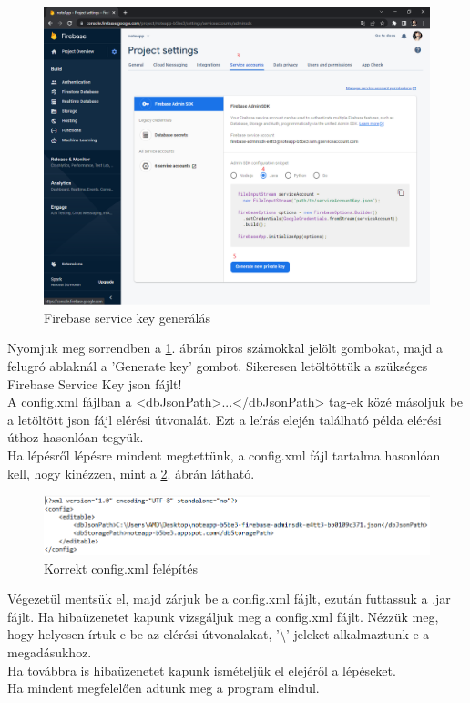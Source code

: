 \begin{figure}[H]
	\centering
	\includegraphics[scale=0.2]{images/config_5.png}
	\caption{Firebase service key generálás}
	\label{fig:firebase_service_key}
\end{figure}
\noindent Nyomjuk meg sorrendben a \ref{fig:firebase_service_key}. ábrán piros számokkal jelölt gombokat, majd a felugró ablaknál a 'Generate key' gombot. Sikeresen letöltöttük a szükséges Firebase Service Key json fájlt!
\vspace{5pt}\\A config.xml fájlban a <dbJsonPath>...</dbJsonPath> tag-ek közé másoljuk be a letöltött json fájl elérési útvonalát. Ezt a leírás elején található példa elérési úthoz hasonlóan tegyük.
\vspace{5pt}\\ Ha lépésről lépésre mindent megtettünk, a config.xml fájl tartalma hasonlóan kell, hogy kinézzen, mint a \ref{fig:config_file_final}. ábrán látható.
\begin{figure}[h]
	\centering
	\includegraphics[scale=0.5]{images/config_6.png}
	\caption{Korrekt config.xml felépítés}
	\label{fig:config_file_final}
\end{figure}
\newline
\noindent Végezetül mentsük el, majd zárjuk be a config.xml fájlt, ezután futtassuk a .jar fájlt. Ha hibaüzenetet kapunk vizsgáljuk meg a config.xml fájlt. Nézzük meg, hogy helyesen írtuk-e be az elérési útvonalakat, '\textbackslash' jeleket alkalmaztunk-e a megadásukhoz. \\Ha továbbra is hibaüzenetet kapunk ismételjük el elejéről a lépéseket.
\vspace{5pt}\\ Ha mindent megfelelően adtunk meg a program elindul.



